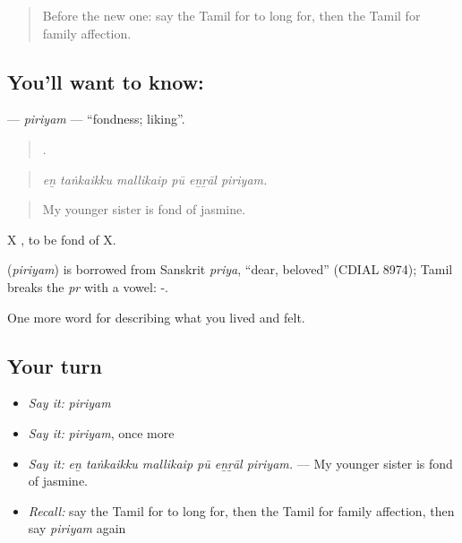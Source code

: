 \label{lesson:TA-C465-piriyam}



\begin{quote}
Before the new one: say the Tamil for to long for, then the Tamil for family affection.
\end{quote}

\subsection*{You'll want to know: }
\textbf{} — \emph{piriyam} — \textquotedblleft{}fondness; liking\textquotedblright{}.

\begin{quote}
     .
\end{quote}

\begin{quote}
\emph{eṉ taṅkaikku mallikaip pū eṉṟāl piriyam.}
\end{quote}

\begin{quote}
My younger sister is fond of jasmine.
\end{quote}

X  , to be fond of X.

\begin{cousinweb}
\textbf{} (\emph{piriyam}) is borrowed from Sanskrit \emph{priya}, \textquotedblleft{}dear, beloved\textquotedblright{} (CDIAL 8974); Tamil breaks the \emph{pr} with a vowel: -.
\end{cousinweb}

\begin{grammarlens}[title={What you've built}]
One more word for describing what you lived and felt.
\end{grammarlens}

\subsection*{Your turn}
\begin{itemize}
\raggedright
  \item \emph{Say it:} \emph{piriyam}
  \item \emph{Say it:} \emph{piriyam}, once more
  \item \emph{Say it:} \emph{eṉ taṅkaikku mallikaip pū eṉṟāl piriyam.} — My younger sister is fond of jasmine.
  \item \emph{Recall:} say the Tamil for to long for, then the Tamil for family affection, then say \emph{piriyam} again
\end{itemize}

